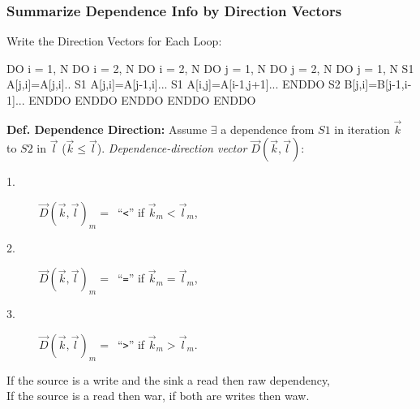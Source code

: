 \documentclass[rgb,dvipsnames]{beamer}
\newcommand{\emp}[1]{\textcolor{DikuRed}{ #1}}
\begin{document}
\begin{frame}[fragile,t]
  \frametitle{Summarize Dependence Info by Direction Vectors} %

\begin{block}{Write the Direction Vectors for Each Loop:}
\begin{colorcode}
  DO i = 1, N            DO i = 2, N               DO i = 2, N
    DO j = 1, N            DO j = 2, N               DO j = 1, N 
S1    A[j,i]=A[j,i]..  S1   A[j,i]=A[j-1,i]...   S1    A[i,j]=A[i-1,j+1]...
    ENDDO              S2   B[j,i]=B[j-1,i-1]...     ENDDO
  ENDDO                  ENDDO ENDDO               ENDDO
\end{colorcode}
\end{block} 



\smallskip


\smallskip

{\bf Def. Dependence Direction:} Assume $\exists$ a dependence from $S1$ in iteration $\vec{k}$
to $S2$ in $\vec{l}$ ($\vec{k}\leq\vec{l}$). 
\emp{\em Dependence-direction vector $\vec{D}(\vec{k},\vec{l})$}:
\begin{description}
    \item[1.] $\vec{D}(\vec{k},\vec{l})_m = $~``{\tt{}<}'' if $\vec{k}_m < \vec{l}_m$,
    \item[2.] $\vec{D}(\vec{k},\vec{l})_m = $~``{\tt{}=}'' if $\vec{k}_m = \vec{l}_m$,
    \item[3.] $\vec{D}(\vec{k},\vec{l})_m = $~``{\tt{}>}'' if $\vec{k}_m > \vec{l}_m$.
\end{description}

\medskip
If the source is a write and the sink a read then {\sc raw} dependency,\\If the source is a read then {\sc war}, if both are writes then {\sc waw}.  
\end{frame}
\end{document}
